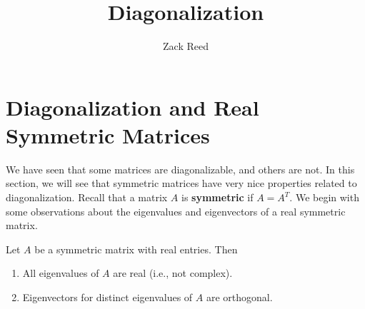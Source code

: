 \documentclass{ximera}
\author{Zack Reed}
\title{Diagonalization}
\begin{document}
\begin{abstract}

\end{abstract}
\maketitle

\section*{Diagonalization and Real Symmetric Matrices}

We have seen that some matrices are diagonalizable, and others are not. In this section, we will see that
symmetric matrices have very nice properties related to diagonalization. Recall that a matrix $A$ is
\textbf{symmetric} if $A=A^T$. We begin with some observations
about the eigenvalues and eigenvectors of a real symmetric matrix.

\begin{proposition}\label{prop:eigenvalues-symmetric}
  Let $A$ be a symmetric matrix with real entries. Then

    \begin{enumerate}
    \item All eigenvalues of $A$ are real (i.e., not complex).
    \item Eigenvectors for distinct eigenvalues of $A$ are orthogonal.
    \end{enumerate}

\end{proposition}
\end{document}
